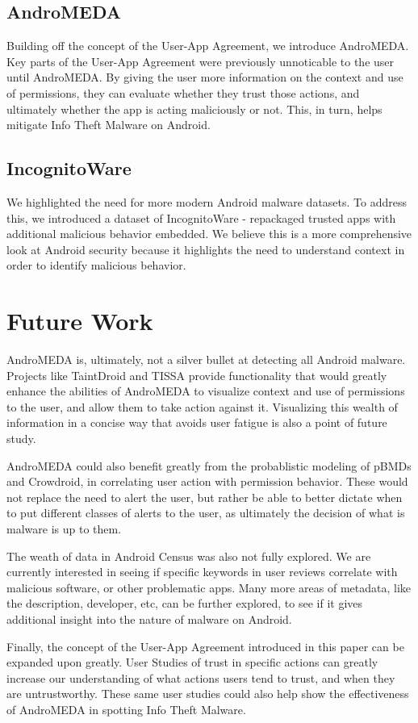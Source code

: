 \subsection{AndroMEDA}
Building off the concept of the User-App Agreement, we introduce AndroMEDA. Key parts of the User-App Agreement were previously unnoticable to the user until AndroMEDA. By giving the user more information on the context and use of permissions, they can evaluate whether they trust those actions, and ultimately whether the app is acting maliciously or not. This, in turn, helps mitigate Info Theft Malware on Android.

\subsection{IncognitoWare}
We highlighted the need for more modern Android malware datasets. To address this, we introduced a dataset of IncognitoWare - repackaged trusted apps with additional malicious behavior embedded. We believe this is a more comprehensive look at Android security because it highlights the need to understand context in order to identify malicious behavior.

\section{Future Work}
\label{sec:futurework}
AndroMEDA is, ultimately, not a silver bullet at detecting all Android malware. Projects like TaintDroid and TISSA provide functionality that would greatly enhance the abilities of AndroMEDA to visualize context and use of permissions to the user, and allow them to take action against it. Visualizing this wealth of information in a concise way that avoids user fatigue is also a point of future study.

AndroMEDA could also benefit greatly from the probablistic modeling of pBMDs and Crowdroid, in correlating user action with permission behavior. These would not replace the need to alert the user, but rather be able to better dictate when to put different classes of alerts to the user, as ultimately the decision of what is malware is up to them.

The weath of data in Android Census was also not fully explored. We are currently interested in seeing if specific keywords in user reviews correlate with malicious software, or other problematic apps. Many more areas of metadata, like the description, developer, etc, can be further explored, to see if it gives additional insight into the nature of malware on Android.

Finally, the concept of the User-App Agreement introduced in this paper can be expanded upon greatly. User Studies of trust in specific actions can greatly increase our understanding of what actions users tend to trust, and when they are untrustworthy. These same user studies could also help show the effectiveness of AndroMEDA in spotting Info Theft Malware.